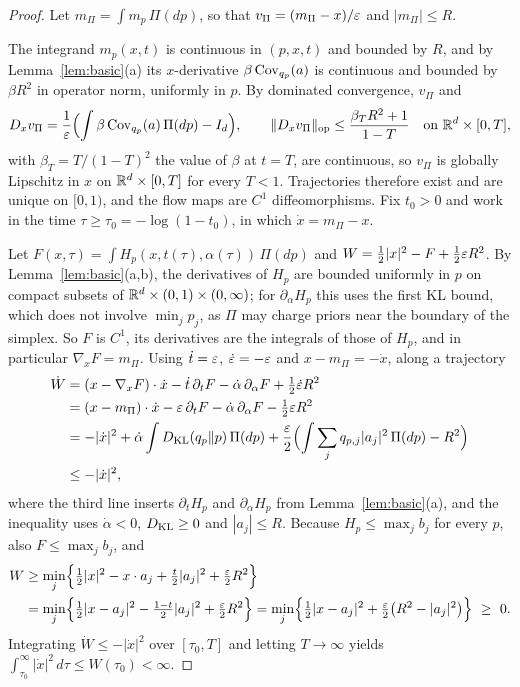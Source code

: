 \documentclass{article} %
\theoremstyle{plain}
\theoremstyle{definition}
\theoremstyle{remark}
\begin{document}
\begin{proof}
Let $m_\Pi=\int m_p\,\Pi(dp)$, so that $v_\Pi=(m_\Pi-x)/\varepsilon$ and $|m_\Pi|\le R$.

The integrand $m_p(x,t)$ is continuous in $(p,x,t)$ and bounded by $R$, and by
Lemma~\ref{lem:basic}(a) its $x$-derivative $\beta\operatorname{Cov}_{q_p}(a)$ is continuous and bounded by
$\beta R^2$ in operator norm, uniformly in $p$. By dominated convergence, $v_\Pi$ and
\[
D_xv_\Pi=\frac{1}{\varepsilon}\Bigl(\int\beta\operatorname{Cov}_{q_p}(a)\,\Pi(dp)-I_d\Bigr),\qquad
\|D_xv_\Pi\|_{\rm op}\le\frac{\beta_TR^2+1}{1-T}\quad\text{on }\mathbb{R}^d\times[0,T],
\]
with $\beta_T=T/(1-T)^2$ the value of $\beta$ at $t=T$, are continuous, so $v_\Pi$ is globally Lipschitz in $x$ on $\mathbb{R}^d\times[0,T]$ for every $T<1$.
Trajectories therefore exist and are unique on $[0,1)$, and the flow maps are $C^1$
diffeomorphisms. Fix $t_0>0$ and work in the time $\tau\ge\tau_0=-\log(1-t_0)$, in which
$\dot x=m_\Pi-x$.

Let $F(x,\tau)=\int H_p(x,t(\tau),\alpha(\tau))\,\Pi(dp)$ and $W=\tfrac12|x|^2-F+\tfrac12\varepsilon R^2$.
By Lemma~\ref{lem:basic}(a,b), the derivatives of $H_p$ are bounded uniformly in $p$ on compact
subsets of $\mathbb{R}^d\times(0,1)\times(0,\infty)$; for $\partial_\alpha H_p$ this uses the first KL
bound, which does not involve $\min_jp_j$, as $\Pi$ may charge priors near the boundary of the
simplex. So $F$ is $C^1$, its derivatives are the integrals of those of $H_p$, and in particular
$\nabla_xF=m_\Pi$. Using $\dot t=\varepsilon$, $\dot{\varepsilon}=-\varepsilon$ and $x-m_\Pi=-\dot x$, along a trajectory
\begin{align*}
\dot W
&=(x-\nabla_xF)\cdot\dot x-\dot t\,\partial_tF-\dot\alpha\,\partial_\alpha F+\tfrac12\dot{\varepsilon} R^2\\
&=(x-m_\Pi)\cdot\dot x-\varepsilon\,\partial_tF-\dot\alpha\,\partial_\alpha F-\tfrac12\varepsilon R^2\\
&=-|\dot x|^2+\dot\alpha\int D_{\rm KL}(q_p\Vert p)\,\Pi(dp)
+\frac{\varepsilon}2\Bigl(\int\sum_jq_{p,j}|a_j|^2\,\Pi(dp)-R^2\Bigr)\\
&\le-|\dot x|^2 ,
\end{align*}
where the third line inserts $\partial_tH_p$ and $\partial_\alpha H_p$ from
Lemma~\ref{lem:basic}(a), and the inequality uses $\dot\alpha<0$, $D_{\rm KL}\ge0$ and
$|a_j|\le R$. Because $H_p\le\max_jb_j$ for every $p$, also $F\le\max_jb_j$, and
\begin{align*}
W&\ge\min_j\Bigl\{\tfrac12|x|^2-x\cdot a_j+\tfrac t2|a_j|^2+\tfrac\eps2R^2\Bigr\}\\
&=\min_j\Bigl\{\tfrac12|x-a_j|^2-\tfrac{1-t}2|a_j|^2+\tfrac\eps2R^2\Bigr\}
=\min_j\Bigl\{\tfrac12|x-a_j|^2+\tfrac\eps2\bigl(R^2-|a_j|^2\bigr)\Bigr\}\ \ge\ 0 .
\end{align*}
Integrating $\dot W\le-|\dot x|^2$ over $[\tau_0,T]$ and letting $T\to\infty$ yields
$\int_{\tau_0}^\infty|\dot x|^2\,d\tau\le W(\tau_0)<\infty$.


\end{proof}
\end{document}
